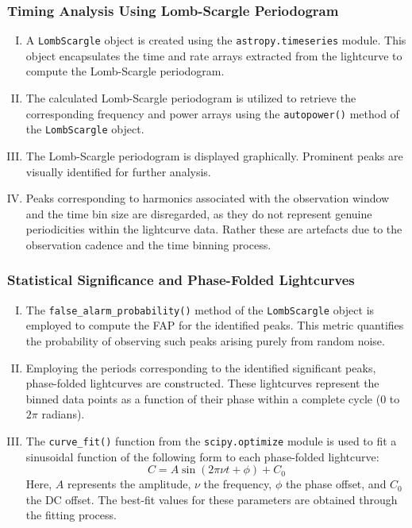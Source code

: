     		\subsubsection{Timing Analysis Using Lomb-Scargle Periodogram}
    			\begin{enumerate}[I.]
    				\item A \texttt{LombScargle} object is created using the \texttt{astropy.timeseries} module. This object encapsulates the time and rate arrays extracted from the lightcurve to compute the Lomb-Scargle periodogram.
    				\item The calculated Lomb-Scargle periodogram is utilized to retrieve the corresponding frequency and power arrays using the \texttt{autopower()} method of the \texttt{LombScargle} object.
    				\item The Lomb-Scargle periodogram is displayed graphically. Prominent peaks are visually identified for further analysis.
    				\item Peaks corresponding to harmonics associated with the observation window and the time bin size are disregarded, as they do not represent genuine periodicities within the lightcurve data. Rather these are artefacts due to the observation cadence and the time binning process.
    			\end{enumerate}
    		
    		\subsubsection{Statistical Significance and Phase-Folded Lightcurves}
    			\begin{enumerate}[I.]
    				\item The \texttt{false\_alarm\_probability()} method of the \texttt{LombScargle} object is employed to compute the FAP for the identified peaks. This metric quantifies the probability of observing such peaks arising purely from random noise.
    				\item Employing the periods corresponding to the identified significant peaks, phase-folded lightcurves are constructed. These lightcurves represent the binned data points as a function of their phase within a complete cycle (0 to $2\pi$ radians).
    				\item The \texttt{curve\_fit()} function from the \texttt{scipy.optimize} module is used to fit a sinusoidal function of the following form to each phase-folded lightcurve:
    				$$C=A\sin(2\pi\nu t+\phi)+C_0$$
    				Here, $A$ represents the amplitude, $\nu$ the frequency, $\phi$ the phase offset, and $C_0$ the DC offset. The best-fit values for these parameters are obtained through the fitting process.
    			\end{enumerate}
    		
